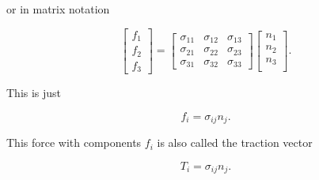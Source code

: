 or in matrix notation

\begin{equation}\label{eqn:continuumL4:370}
\begin{bmatrix}
f_1  \\
f_2  \\
f_3 
\end{bmatrix}
=
\begin{bmatrix}
\sigma_{11} & \sigma_{12} & \sigma_{13} \\
\sigma_{21} & \sigma_{22} & \sigma_{23} \\
\sigma_{31} & \sigma_{32} & \sigma_{33} 
\end{bmatrix}
\begin{bmatrix}
n_1 \\
n_2 \\
n_3 \\
\end{bmatrix}.
\end{equation}

This is just 

\begin{equation}\label{eqn:continuumL4:390}
\boxed{
f_i = \sigma_{ij} n_j.
}
\end{equation}

This force with components $f_i$ is also called the traction vector

\begin{equation}\label{eqn:continuumL4:410}
T_i = \sigma_{ij} n_j.
\end{equation}
